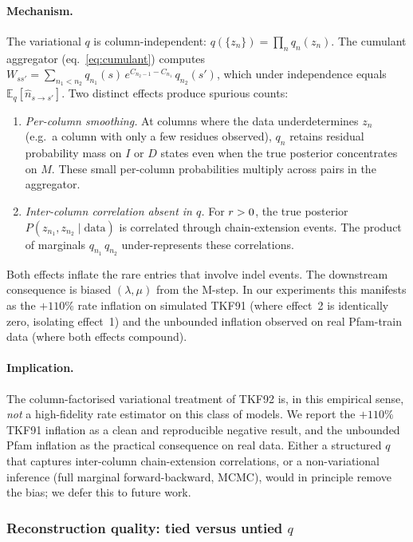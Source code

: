 \paragraph{Mechanism.}
The variational $q$ is column-independent: $q(\{z_n\}) = \prod_n q_n(z_n)$.
The cumulant aggregator (eq.~\ref{eq:cumulant}) computes
$W_{ss'} = \sum_{n_1<n_2} q_{n_1}(s)\,e^{C_{n_2-1}-C_{n_1}}\,q_{n_2}(s')$,
which under independence equals
$\mathbb{E}_q[\hat n_{s\to s'}]$.  Two distinct effects produce
spurious counts:
\begin{enumerate}[nosep]
\item \emph{Per-column smoothing.}  At columns where the data
  underdetermines $z_n$ (e.g.\ a column with only a few residues
  observed), $q_n$ retains residual probability mass on $I$ or $D$
  states even when the true posterior concentrates on $M$.  These
  small per-column probabilities multiply across pairs in the
  aggregator.
\item \emph{Inter-column correlation absent in $q$.}  For
  $r > 0$, the true posterior $P(z_{n_1}, z_{n_2} \mid \text{data})$
  is correlated through chain-extension events.  The product of
  marginals $q_{n_1}\,q_{n_2}$ under-represents these correlations.
\end{enumerate}
Both effects inflate the rare entries that involve indel events.
The downstream consequence is biased $(\lambda, \mu)$ from the
M-step.  In our experiments this manifests as the $+110\%$ rate
inflation on simulated TKF91 (where effect~2 is identically zero,
isolating effect~1) and the unbounded inflation observed on real
Pfam-train data (where both effects compound).

\paragraph{Implication.}
The column-factorised variational treatment of TKF92 is, in this
empirical sense, \emph{not} a high-fidelity rate estimator on this
class of models.  We report the $+110\%$ TKF91 inflation as a
clean and reproducible negative result, and the unbounded Pfam
inflation as the practical consequence on real data.  Either a
structured $q$ that captures inter-column chain-extension
correlations, or a non-variational inference (full marginal
forward-backward, MCMC), would in principle remove the bias; we
defer this to future work.

\subsubsection{Reconstruction quality: tied versus untied \texorpdfstring{$q$}{q}}

